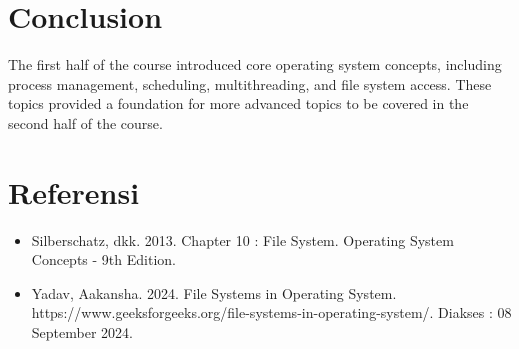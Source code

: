 \documentclass[12pt]{article}
\begin{document}
\section{Conclusion}
The first half of the course introduced core operating system concepts, including process management, scheduling, multithreading, and file system access. These topics provided a foundation for more advanced topics to be covered in the second half of the course.

\section{Referensi}
\sloppy
\begin{itemize}
    \item {Silberschatz, dkk. 2013. Chapter 10 : File System. Operating System Concepts - 9th Edition.}
    \item {Yadav, Aakansha. 2024. File Systems in Operating System. https://www.geeksforgeeks.org/file-systems-in-operating-system/. Diakses : 08 September 2024.}
\end{itemize}
\fussy
\end{document}
